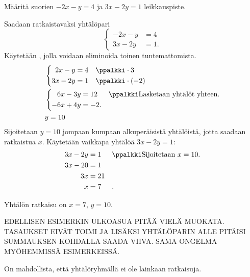 \begin{esimerkki}
Määritä suorien $-2x-y= 4$ ja $3x-2y=1$ leikkauspiste.
\begin{esimratk}
Saadaan ratkaistavaksi yhtälöpari
\[
\left\{
\begin{aligned}
-2x-y&= 4 \\
3x-2y&= 1.
\end{aligned}
\right.
\]
Käytetään , jolla voidaan eliminoida toinen tuntemattomista.
\begin{align*}
&\left\{
\begin{aligned}
2x-y&= 4 && \ppalkki \cdot 3\\
3x-2y&= 1 && \ppalkki \cdot (-2)
\end{aligned}
\right. \\
&\left\{
\begin{aligned}
6x-3y&= 12 && \ppalkki \text{Lasketaan yhtälöt yhteen.}\\
-6x+4y&= -2.&&
\end{aligned}
\right.\\
&y= 10 \\
\end{align*}
Sijoitetaan $y=10$ jompaan kumpaan alkuperäisistä yhtälöistä, jotta saadaan ratkaistua $x$. Käytetään vaikkapa yhtälöä $3x-2y=1$:
\begin{align*}
3x-2y&=1 && \ppalkki \text{Sijoitetaan $x=10$.} \\
3x-20&=1 && \\
3x&=21 && \\
x&=7 &&.
\end{align*}
\end{esimratk}
\begin{esimvast}
Yhtälön ratkaisu on $x=7$, $y=10$.
\end{esimvast}
\end{esimerkki}

EDELLISEN ESIMERKIN ULKOASUA PITÄÄ VIELÄ MUOKATA. TASAUKSET EIVÄT TOIMI JA LISÄKSI YHTÄLÖPARIN ALLE PITÄISI SUMMAUKSEN KOHDALLA SAADA VIIVA. SAMA ONGELMA MYÖHEMMISSÄ ESIMERKEISSÄ.

On mahdollista, että yhtälöryhmällä ei ole lainkaan ratkaisuja.

